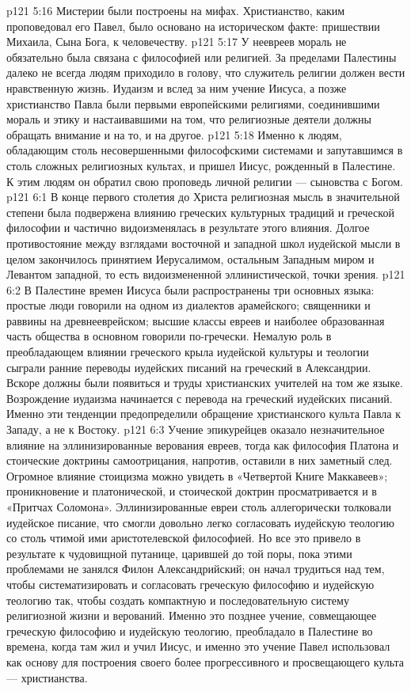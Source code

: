 \vs p121 5:16 \bibnobreakspace Мистерии были построены на мифах. Христианство, каким проповедовал его Павел, было основано на историческом факте: пришествии Михаила, Сына Бога, к человечеству.
\vs p121 5:17 \pc У неевреев мораль не обязательно была связана с философией или религией. За пределами Палестины далеко не всегда людям приходило в голову, что служитель религии должен вести нравственную жизнь. Иудаизм и вслед за ним учение Иисуса, а позже христианство Павла были первыми европейскими религиями, соединившими мораль и этику и настаивавшими на том, что религиозные деятели должны обращать внимание и на то, и на другое.
\vs p121 5:18 Именно к людям, обладающим столь несовершенными философскими системами и запутавшимся в столь сложных религиозных культах, и пришел Иисус, рожденный в Палестине. К этим людям он обратил свою проповедь личной религии --- сыновства с Богом.
\vs p121 6:1 В конце первого столетия до Христа религиозная мысль в значительной степени была подвержена влиянию греческих культурных традиций и греческой философии и частично видоизменялась в результате этого влияния. Долгое противостояние между взглядами восточной и западной школ иудейской мысли в целом закончилось принятием Иерусалимом, остальным Западным миром и Левантом западной, то есть видоизмененной эллинистической, точки зрения.
\vs p121 6:2 В Палестине времен Иисуса были распространены три основных языка: простые люди говорили на одном из диалектов арамейского; священники и раввины на древнееврейском; высшие классы евреев и наиболее образованная часть общества в основном говорили по\hyp{}гречески. Немалую роль в преобладающем влиянии греческого крыла иудейской культуры и теологии сыграли ранние переводы иудейских писаний на греческий в Александрии. Вскоре должны были появиться и труды христианских учителей на том же языке. Возрождение иудаизма начинается с перевода на греческий иудейских писаний. Именно эти тенденции предопределили обращение христианского культа Павла к Западу, а не к Востоку.
\vs p121 6:3 Учение эпикурейцев оказало незначительное влияние на эллинизированные верования евреев, тогда как философия Платона и стоические доктрины самоотрицания, напротив, оставили в них заметный след. Огромное влияние стоицизма можно увидеть в «Четвертой Книге Маккавеев»; проникновение и платонической, и стоической доктрин просматривается и в «Притчах Соломона». Эллинизированные евреи столь аллегорически толковали иудейское писание, что смогли довольно легко согласовать иудейскую теологию со столь чтимой ими аристотелевской философией. Но все это привело в результате к чудовищной путанице, царившей до той поры, пока этими проблемами не занялся Филон Александрийский; он начал трудиться над тем, чтобы систематизировать и согласовать греческую философию и иудейскую теологию так, чтобы создать компактную и последовательную систему религиозной жизни и верований. Именно это позднее учение, совмещающее греческую философию и иудейскую теологию, преобладало в Палестине во времена, когда там жил и учил Иисус, и именно это учение Павел использовал как основу для построения своего более прогрессивного и просвещающего культа --- христианства.
